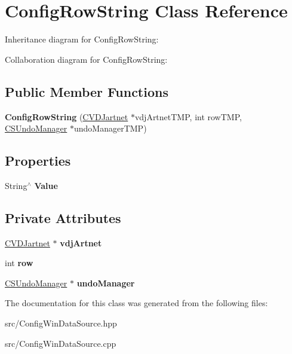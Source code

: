\hypertarget{classConfigRowString}{}\section{Config\+Row\+String Class Reference}
\label{classConfigRowString}


Inheritance diagram for Config\+Row\+String\+:


Collaboration diagram for Config\+Row\+String\+:
\subsection*{Public Member Functions}
\begin{DoxyCompactItemize}
\item 
\mbox{\label{classConfigRowString_a348063d0711e1f4d3ddf057232e44c9b}} 
{\bfseries Config\+Row\+String} (\hyperlink{classCVDJartnet}{C\+V\+D\+Jartnet} $\ast$vdj\+Artnet\+T\+MP, int row\+T\+MP, \hyperlink{classCSUndoManager}{C\+S\+Undo\+Manager} $\ast$undo\+Manager\+T\+MP)
\end{DoxyCompactItemize}
\subsection*{Properties}
\begin{DoxyCompactItemize}
\item 
\mbox{\label{classConfigRowString_a4b6b5dd3990a99d10b1275a2f76c4f43}} 
String$^\wedge$ {\bfseries Value}
\end{DoxyCompactItemize}
\subsection*{Private Attributes}
\begin{DoxyCompactItemize}
\item 
\mbox{\label{classConfigRowString_a4f6771ddf4408a288a5a51cbc85839b9}} 
\hyperlink{classCVDJartnet}{C\+V\+D\+Jartnet} $\ast$ {\bfseries vdj\+Artnet}
\item 
\mbox{\label{classConfigRowString_ab16219946bb24b5d9a2336187b543330}} 
int {\bfseries row}
\item 
\mbox{\label{classConfigRowString_a4d926f855929fd76eeebf0b798adcf99}} 
\hyperlink{classCSUndoManager}{C\+S\+Undo\+Manager} $\ast$ {\bfseries undo\+Manager}
\end{DoxyCompactItemize}


The documentation for this class was generated from the following files\+:\begin{DoxyCompactItemize}
\item 
src/Config\+Win\+Data\+Source.\+hpp\item 
src/Config\+Win\+Data\+Source.\+cpp\end{DoxyCompactItemize}
